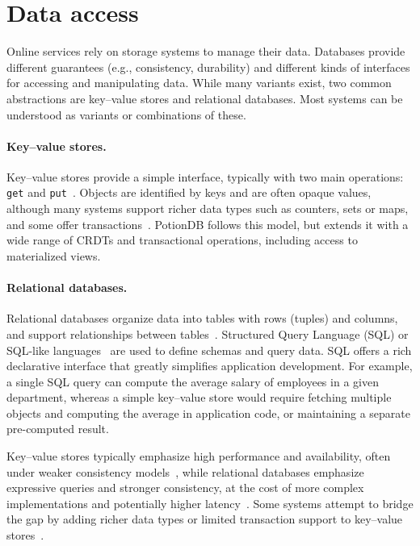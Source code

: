 \section{Data access}
\label{sec:data-access}

Online services rely on storage systems to manage their data. Databases provide
different guarantees (e.g., consistency, durability) and different kinds of
interfaces for accessing and manipulating data. While many variants exist, two
common abstractions are key–value stores and relational databases. Most systems
can be understood as variants or combinations of these.

\paragraph{Key–value stores.}

Key–value stores provide a simple interface, typically with two main operations:
\texttt{get} and \texttt{put}~\cite{dynamo,occic2012causal,cure,walter,redis}.
Objects are identified by keys and are often opaque values, although many systems
support richer data types such as counters, sets or maps, and some offer
transactions~\cite{cure,walter,redis}. PotionDB follows this model, but extends
it with a wide range of CRDTs and transactional operations, including access to
materialized views.

\paragraph{Relational databases.}

Relational databases organize data into tables with rows (tuples) and columns,
and support relationships between tables~\cite{silberschatz2005database}.
Structured Query Language (SQL) or SQL-like languages~\cite{sequel,spanner} are
used to define schemas and query data. SQL offers a rich declarative interface
that greatly simplifies application development. For example, a single SQL query
can compute the average salary of employees in a given department, whereas a
simple key–value store would require fetching multiple objects and computing the
average in application code, or maintaining a separate pre-computed result.

Key–value stores typically emphasize high performance and availability, often
under weaker consistency models~\cite{dynamo,occic2012causal,cure},
while relational databases emphasize expressive queries and stronger
consistency, at the cost of more complex implementations and potentially higher
latency~\cite{silberschatz2005database,spanner}. Some systems attempt to bridge
the gap by adding richer data types or limited transaction support to key–value
stores~\cite{cure,walter}.

